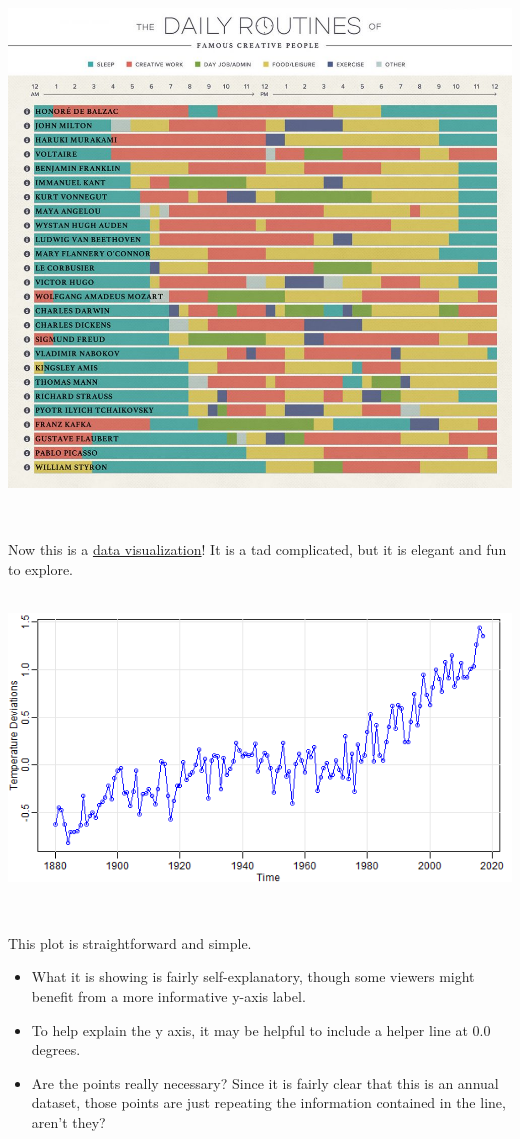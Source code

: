 \documentclass[
]{book}
\providecommand{\tightlist}{%
  \setlength{\itemsep}{0pt}\setlength{\parskip}{0pt}}
\begin{document}
~\\

\includegraphics{img/vis-routines.jpeg}

~

Now this is a \href{https://podio.com/site/creative-routines}{data visualization}! It is a tad complicated, but it is elegant and fun to explore.

~\\

\includegraphics{img/visi.png}

~

This plot is straightforward and simple.

\begin{itemize}
\tightlist
\item
  What it is showing is fairly self-explanatory, though some viewers might benefit from a more informative y-axis label.
\item
  To help explain the y axis, it may be helpful to include a helper line at 0.0 degrees.\\
\item
  Are the points really necessary? Since it is fairly clear that this is an annual dataset, those points are just repeating the information contained in the line, aren't they?
\end{itemize}
\end{document}

